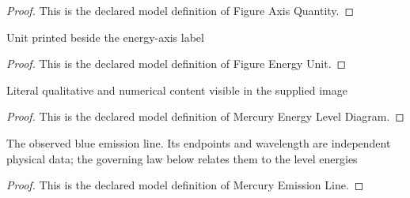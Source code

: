 \begin{proof}
  This is the declared model definition of Figure Axis Quantity.
\end{proof}
\begin{definition}
  \label{def:physics:phyx-mini-0659:phyxminiproblems-problemphyxmini0659-figureenergyunit}
  Unit printed beside the energy-axis label
\end{definition}
\begin{proof}
  This is the declared model definition of Figure Energy Unit.
\end{proof}
\begin{definition}
  \label{def:physics:phyx-mini-0659:phyxminiproblems-problemphyxmini0659-mercuryenergyleveldiagram}
  Literal qualitative and numerical content visible in the supplied image
\end{definition}
\begin{proof}
  This is the declared model definition of Mercury Energy Level Diagram.
\end{proof}
\begin{definition}
  \label{def:physics:phyx-mini-0659:phyxminiproblems-problemphyxmini0659-mercuryemissionline}
  The observed blue emission line. Its endpoints and wavelength are independent physical data; the governing law below relates them to the level energies
\end{definition}
\begin{proof}
  This is the declared model definition of Mercury Emission Line.
\end{proof}
